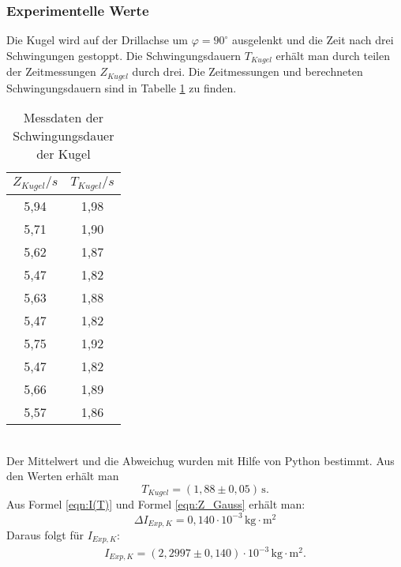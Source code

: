\subsubsection{Experimentelle Werte}
Die Kugel wird auf der Drillachse um $\varphi = 90^{\circ}$ ausgelenkt und die Zeit nach drei
Schwingungen gestoppt. Die Schwingungsdauern $T_{Kugel}$ erhält man durch teilen der Zeitmessungen
$Z_{Kugel}$ durch drei. Die Zeitmessungen und berechneten Schwingungsdauern sind in
Tabelle \ref{tab:T_Kugel} zu finden.
\begin{table}
  \centering
  \caption{Messdaten der Schwingungsdauer der Kugel}
  \label{tab:T_Kugel}
  \begin{tabular}{c c}
    \toprule
    $Z_{Kugel}/s$ & $T_{Kugel}/s$ \\
    \midrule
    5,94 & 1,98 \\
    5,71 & 1,90 \\
    5,62 & 1,87 \\
    5,47 & 1,82 \\
    5,63 & 1,88 \\
    5,47 & 1,82 \\
    5,75 & 1,92 \\
    5,47 & 1,82 \\
    5,66 & 1,89 \\
    5,57 & 1,86 \\
    \bottomrule
  \end{tabular}
\end{table}
\\
Der Mittelwert und die Abweichug wurden mit Hilfe von Python bestimmt. Aus den Werten erhält man
\begin{equation}
  T_{Kugel} = (1{,}88 \pm 0{,}05)\, \mathrm{s} .
\end{equation}
Aus Formel \ref{eqn:I(T)} und Formel \ref{eqn:Z_Gauss} erhält man:
\begin{equation*}
  \Delta I_{Exp, K} = 0{,}140 \cdot 10^{-3} \, \mathrm{kg \cdot m^2}
\end{equation*}
Daraus folgt für $I_{Exp, K}$:
\begin{align*}
  I_{Exp, K} = (2{,}2997 \pm 0{,}140)\cdot 10^{-3} \, \mathrm{kg \cdot m^2}.
\end{align*}

